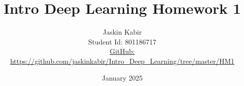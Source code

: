 \centering

\title{\Huge Intro Deep Learning Homework 1}

\author{ \huge
Jaskin Kabir \\
\Large Student Id: 801186717 \\
\Large \href{https://github.com/jaskinkabir/Intro_Deep_Learning/tree/master/HM1}{GitHub:}\\\url{https://github.com/jaskinkabir/Intro_Deep_Learning/tree/master/HM1}
}

\date{January 2025}

\begin{titlingpage}
\maketitle
\end{titlingpage}